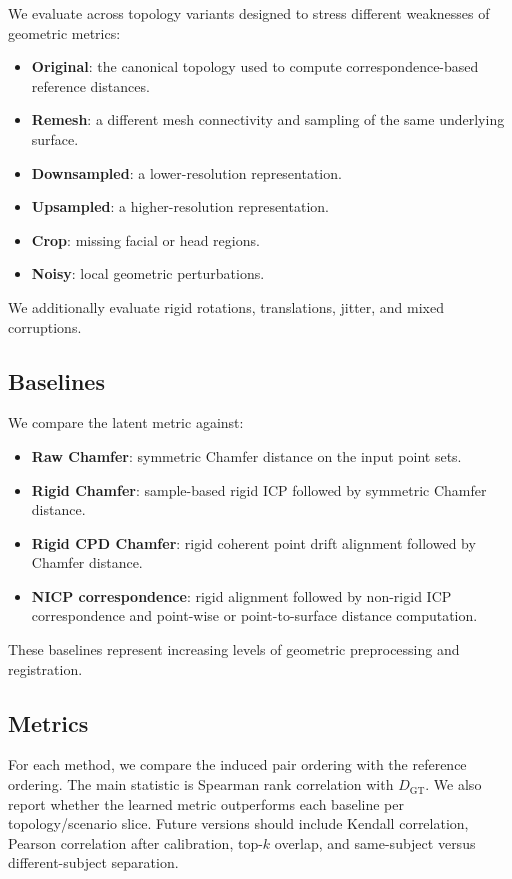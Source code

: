 \documentclass{article}
\begin{document}
We evaluate across topology variants designed to stress different weaknesses of geometric metrics:
\begin{itemize}
    \item \textbf{Original}: the canonical topology used to compute correspondence-based reference distances.
    \item \textbf{Remesh}: a different mesh connectivity and sampling of the same underlying surface.
    \item \textbf{Downsampled}: a lower-resolution representation.
    \item \textbf{Upsampled}: a higher-resolution representation.
    \item \textbf{Crop}: missing facial or head regions.
    \item \textbf{Noisy}: local geometric perturbations.
\end{itemize}
We additionally evaluate rigid rotations, translations, jitter, and mixed corruptions.

\subsection{Baselines}

We compare the latent metric against:
\begin{itemize}
    \item \textbf{Raw Chamfer}: symmetric Chamfer distance on the input point sets.
    \item \textbf{Rigid Chamfer}: sample-based rigid ICP followed by symmetric Chamfer distance.
    \item \textbf{Rigid CPD Chamfer}: rigid coherent point drift alignment followed by Chamfer distance.
    \item \textbf{NICP correspondence}: rigid alignment followed by non-rigid ICP correspondence and point-wise or point-to-surface distance computation.
\end{itemize}
These baselines represent increasing levels of geometric preprocessing and registration.

\subsection{Metrics}

For each method, we compare the induced pair ordering with the reference ordering. The main statistic is Spearman rank correlation with $D_{\mathrm{GT}}$. We also report whether the learned metric outperforms each baseline per topology/scenario slice. Future versions should include Kendall correlation, Pearson correlation after calibration, top-$k$ overlap, and same-subject versus different-subject separation.
\end{document}
